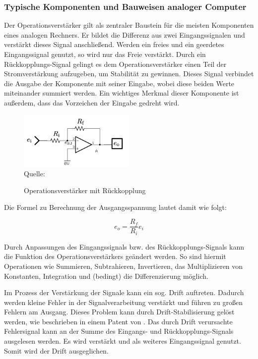 \subsubsection{Typische Komponenten und Bauweisen analoger Computer}
\label{chap:Typische Komponenten und Bauweisen analoger Computer}

Der Operationsverstärker gilt als zentraler Baustein für die meisten Komponenten eines analogen Rechners. Er bildet die Differenz aus zwei Eingangssignalen und verstärkt dieses Signal anschließend. Werden ein freies und ein geerdetes Eingangssignal genutzt, so wird nur das Freie verstärkt. Durch ein Rückkopplungs-Signal gelingt es dem Operationsverstärker einen Teil der Stromverstärkung aufzugeben, um Stabilität zu gewinnen. Dieses Signal verbindet die Ausgabe der Komponente mit seiner Eingabe, wobei diese beiden Werte miteinander summiert werden. Ein wichtiges Merkmal dieser Komponente ist außerdem, dass das Vorzeichen der Eingabe gedreht wird. \cite[vgl. S. 73 f.]{Ulmann2022}

\begin{figure}[h]
  \label{fig:Operationsverstärker mit Rückkopplung}
  \caption{Operationsverstärker mit Rückkopplung}
  \includegraphics[width=0.5\textwidth]{abbildungen/opamp_mit_rueckkopplung.png}
  \\
  Quelle: \cite[S. 76]{Ulmann2022}
\end{figure}

Die Formel zu Berechnung der Ausgangsspannung lautet damit wie folgt:

\[e_o=\frac{R_f}{R_i}e_i\]

Durch Anpassungen des Eingangssignals bzw. des Rückkopplungs-Signals kann die Funktion des Operationsverstärkers geändert werden. So sind hiermit Operationen wie Summieren, Subtrahieren, Invertieren, das Multiplizieren von Konstanten, Integration und (bedingt) die Differenzierung möglich.

Im Prozess der Verstärkung der Signale kann ein sog. Drift auftreten. Dadurch werden kleine Fehler in der Signalverarbeitung verstärkt und führen zu großen Fehlern am Ausgang. Dieses Problem kann durch Drift-Stabilisierung gelöst werden, wie beschrieben in einem Patent von \cite{Goldberg1954}. Das durch Drift verursachte Fehlersignal kann an der Summe des Eingangs- und Rückkopplungs-Signals ausgelesen werden. Es wird verstärkt und als weiteres Eingangssignal genutzt. Somit wird der Drift ausgeglichen. \cite[vgl. S. 80]{Ulmann2022}

